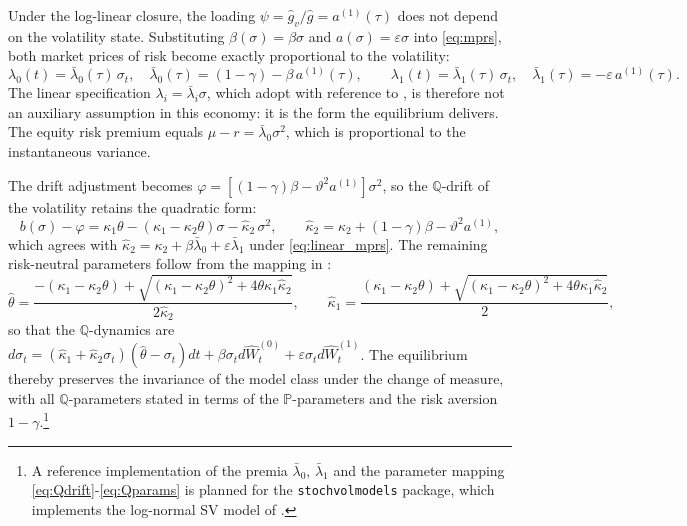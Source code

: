 \documentclass[11pt]{article}
\theoremstyle{remark}
\newcommand{\PP}{\mathbb{P}}
\newcommand{\QQ}{\mathbb{Q}}
\begin{document}
Under the log-linear closure, the loading $\psi = \hat{g}_{v}/\hat{g} = a^{(1)}(\tau)$ does not depend on the volatility state. Substituting $\beta(\sigma)=\beta\sigma$ and $a(\sigma)=\varepsilon\sigma$ into \eqref{eq:mprs}, both market prices of risk become exactly proportional to the volatility:
\begin{equation}\label{eq:linear_mprs}
\lambda_{0}(t) = \bar\lambda_{0}(\tau)\, \sigma_{t}, \quad \bar\lambda_{0}(\tau) = (1-\gamma) - \beta\, a^{(1)}(\tau),
\qquad
\lambda_{1}(t) = \bar\lambda_{1}(\tau)\, \sigma_{t}, \quad \bar\lambda_{1}(\tau) = -\varepsilon\, a^{(1)}(\tau).
\end{equation}
The linear specification $\lambda_{i} = \bar\lambda_{i}\sigma$, which \cite{SeppRakhmonov2024} adopt with reference to \cite{BakshiKapadia2003}, is therefore not an auxiliary assumption in this economy: it is the form the equilibrium delivers. The equity risk premium equals $\mu - r = \bar\lambda_{0}\sigma^{2}$, which is proportional to the instantaneous variance.

The drift adjustment becomes $\varphi = \left[ (1-\gamma)\beta - \vartheta^{2} a^{(1)} \right]\sigma^{2}$, so the $\QQ$-drift of the volatility retains the quadratic form:
\begin{equation}\label{eq:Qdrift}
b(\sigma) - \varphi = \kappa_{1}\theta - \left(\kappa_{1}-\kappa_{2}\theta\right)\sigma - \hat\kappa_{2}\, \sigma^{2},
\qquad
\hat\kappa_{2} = \kappa_{2} + (1-\gamma)\beta - \vartheta^{2} a^{(1)},
\end{equation}
which agrees with $\hat\kappa_{2} = \kappa_{2}+\beta\bar\lambda_{0}+\varepsilon\bar\lambda_{1}$ under \eqref{eq:linear_mprs}. The remaining risk-neutral parameters follow from the mapping in \cite{SeppRakhmonov2024}:
\begin{equation}\label{eq:Qparams}
\hat \theta =  \frac{ - (\kappa_1-\kappa_2\theta) + \sqrt{(\kappa_1-\kappa_2\theta)^{2}+4\theta\kappa_{1}\hat\kappa_2}}{2\hat\kappa_2}, \qquad
\hat \kappa_1 = \frac{ (\kappa_1-\kappa_2\theta) +  \sqrt{(\kappa_1-\kappa_2\theta)^{2}+4\theta\kappa_{1}\hat\kappa_2}}{2},
\end{equation}
so that the $\QQ$-dynamics are $d\sigma_{t} = (\hat\kappa_{1}+\hat\kappa_{2}\sigma_{t})(\hat\theta - \sigma_{t})dt + \beta\sigma_{t}d\hat{W}^{(0)}_{t}+\varepsilon\sigma_{t}d\hat{W}^{(1)}_{t}$. The equilibrium thereby preserves the invariance of the model class under the change of measure, with all $\QQ$-parameters stated in terms of the $\PP$-parameters and the risk aversion $1-\gamma$.\footnote{A reference implementation of the premia $\bar\lambda_{0}$, $\bar\lambda_{1}$ and the parameter mapping \eqref{eq:Qdrift}-\eqref{eq:Qparams} is planned for the \texttt{stochvolmodels} package, which implements the log-normal SV model of \cite{SeppRakhmonov2024}.}
\end{document}
